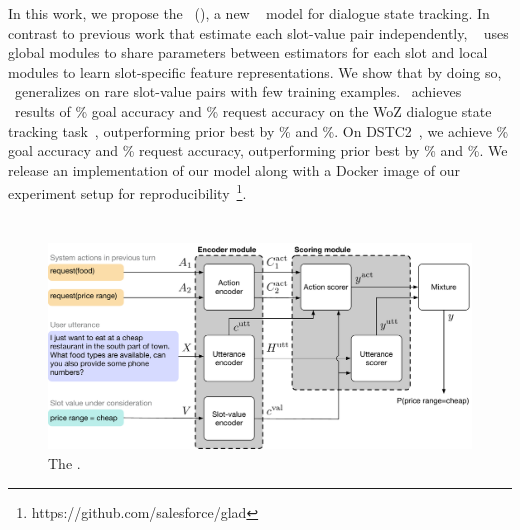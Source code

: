 \documentclass[11pt,a4paper]{article}
\begin{document}
In this work, we propose the \modelnamehighlight~(\modelnameshort), a new \sota~ model for dialogue state tracking.
In contrast to previous work that estimate each slot-value pair independently,
\modelnameshort~ uses global modules to share parameters between estimators for each slot and local modules to learn slot-specific feature representations.
We show that by doing so, \modelnameshort~generalizes on rare slot-value pairs with few training examples.
\modelnameshort~achieves \sota~results of \goalacc\% goal accuracy and \requestacc\% request accuracy on the WoZ dialogue state tracking task~\citep{wen2017NetworkBasedEndToEndDialogueSystem}, outperforming prior best by \goaldiff\% and \requestdiff\%.
On DSTC2~\citep{dstc2}, we achieve \dstcgoalacc\% goal accuracy and \dstcrequestacc\% request accuracy, outperforming prior best by \dstcgoaldiff\% and \dstcrequestdiff\%.
We release an implementation of our model along with a Docker image of our experiment setup for reproducibility~\footnote{https://github.com/salesforce/glad}.





\section{\modelname}





\begin{figure}[!t]
\centering
\includegraphics[width=\linewidth]{figures/model.pdf}
\caption{
The \modelname.
}
\label{fig:model}
\end{figure}
\end{document}

